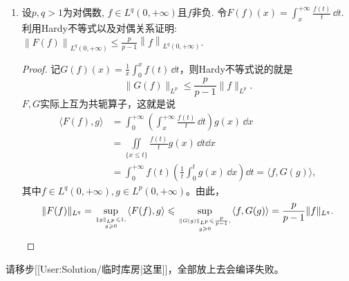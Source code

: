 \begin{b}
\begin{enumerate}
\begin{proof}
For the second inequality we proceed analogously with $g(x)=|f(x)| x^{1+\frac{b}{p}}$ and $h(x)=x^{\frac{b}{p}} \chi_{(0,1]}$. We have
$$(g * h)(x)=\int_0^{\infty}|f(t)| t^{1+\frac{b}{p}}\left(\frac{x}{t}\right)^{\frac{b}{p}} \chi_{(0,1]}\left(\frac{x}{t}\right) \frac{d t}{t}
=x^{\frac{b}{p}} \int_x^{\infty}|f(t)| \, d t.$$
We also have
\begin{align*}
\|g * h\|_{L^p}&=\left(\int_0^{\infty}\left(\int_x^{\infty}|f(t)| d t\right)^p x^b \frac{d x}{x}\right)\\
&=\left(\int_0^{\infty}\left(\int_x^{\infty}|f(t)| d t\right)^p x^{b-1} d x\right), \\
\end{align*}
$$\|g\|_{L^p}=\left(\int_0^{\infty}|f(t)|^p t^{p+b-1} d t\right)^{\frac{1}{p}},$$
and
$$\|h\|_{L^1}=\int_0^{\infty} t^{\frac{b}{p}} \chi_{(0,1]}(t) \frac{d t}{t}
=\int_0^1 t^{\frac{b}{p}-1} d t=\frac{p}{b}.$$
so the desired inequality again follows from $\|g*h\|_{L^p}\leqslant\|g\|_{L^p}\|h\|_{L^1}$.
\end{proof}
\item 设\(p,q>1\)为对偶数, \(f\in L^q(0,+\infty)\)且\(f\)非负. 
令\(F(f)(x)=\int_{x}^{+\infty}\frac{f(t)}{t}\,\dd t.\)
利用Hardy不等式以及对偶关系证明: \(\left\|F(f)\right\|_{L^q(0,+\infty)}
\leqslant\frac{p}{p-1}\left\|f\right\|_{L^q(0,+\infty)}\).
\begin{proof}
记\(G(f)(x)=\frac{1}{x}\int_{0}^{x}f(t)\,\dd t\)，则Hardy不等式说的就是
\[\|G(f)\|_{L^p}\leqslant\frac{p}{p-1}\|f\|_{L^p}.\]
$F,G$实际上互为共轭算子，这就是说
\begin{align*}
\langle F(f),g \rangle&=\int_0^{+\infty}\left(\int_{x}^{+\infty}\frac{f(t)}{t}\,\dd t\right)g(x)\,\dd x\\
&=\iint\limits_{\{x \leqslant t\}}\frac{f(t)}{t}g(x)\,\dd t\dd x\\
&=\int_0^{+\infty}f(t)\left(\frac{1}{t}\int_0^t g(x)\,\dd x\right)\dd t=\langle f,G(g) \rangle,
\end{align*}
其中$f\in L^q(0,+\infty),g\in L^p(0,+\infty)$。由此，
\[\|F(f)\|_{L^q}=\sup_{\|g\|_{L^p}\leqslant1, \atop g\geqslant0}\langle F(f),g \rangle
\leqslant\sup_{\|G(g)\|_{L^p}\leqslant\frac{p}{p-1}, \atop g\geqslant 0}\langle f,G(g) \rangle
=\frac{p}{p-1}\|f\|_{L^q}.\qedhere\]
\end{proof}
\end{enumerate}
\end{b}
\printfootnotes

请移步[[User:Solution/临时库房|这里]]，全部放上去会编译失败。
